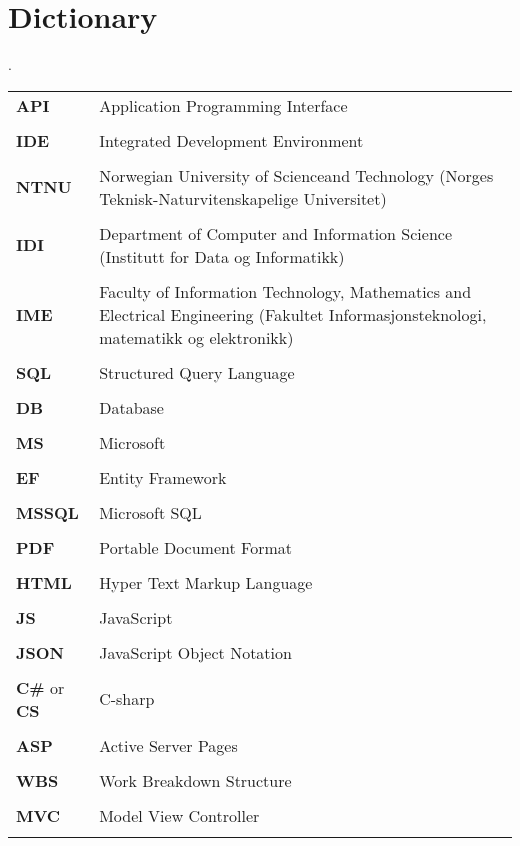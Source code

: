 \chapter{Dictionary}.
\begin{longtable}{l p{10cm}}
\textbf{API} & Application Programming Interface\\\\
\textbf{IDE} & Integrated Development Environment\\\\
\textbf{NTNU} & Norwegian University of Scienceand Technology (Norges Teknisk-Naturvitenskapelige Universitet)\\\\
\textbf{IDI} & Department of Computer and Information Science (Institutt for Data og Informatikk)\\\\
\textbf{IME} & Faculty of Information Technology, Mathematics and Electrical Engineering (Fakultet Informasjonsteknologi, matematikk og elektronikk)\\\\
\textbf{SQL} & Structured Query Language\\\\
\textbf{DB} & Database\\\\
\textbf{MS} & Microsoft\\\\
\textbf{EF} & Entity Framework\\\\
\textbf{MSSQL} & Microsoft SQL\\\\
\textbf{PDF} & Portable Document Format\\\\
\textbf{HTML} & Hyper Text Markup Language\\\\
\textbf{JS} & JavaScript\\\\
\textbf{JSON }& JavaScript Object Notation\\\\
\textbf{C\#} or \textbf{CS} & C-sharp\\\\
\textbf{ASP} & Active Server Pages\\\\
\textbf{WBS} & Work Breakdown Structure\\\\
\textbf{MVC} & Model View Controller\\\\

\end{longtable}

